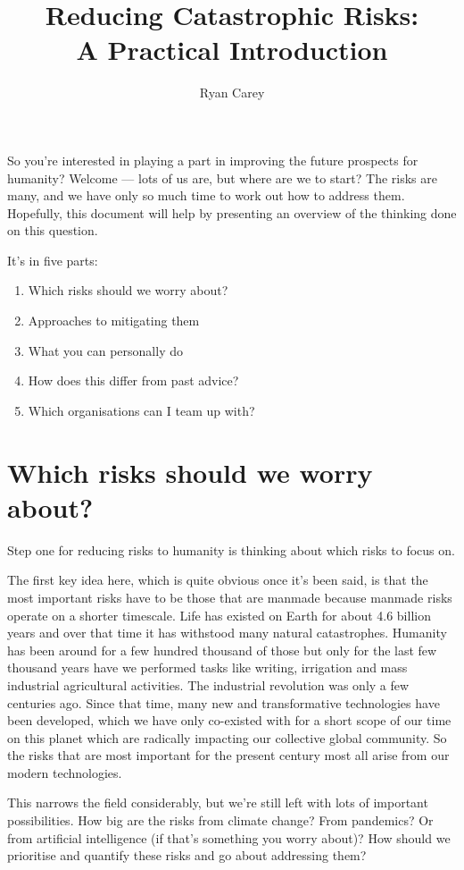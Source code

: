 \documentclass[12pt]{article}
\title{Reducing Catastrophic Risks:\\ A Practical Introduction}
\author{Ryan Carey}
\begin{document}
\maketitle
So you're interested in playing a part in improving the future prospects for humanity? Welcome --- lots of us are, but 
where are we to start? The risks are many, and we have only so much time to work out how to address them. Hopefully, 
this document 
will help by presenting an overview of the thinking done on this question.

It's in five parts: 
\begin{enumerate}
    \item Which risks should we worry about?
    \item Approaches to mitigating them
    \item What you can personally do 
    \item How does this differ from past advice? 
    \item Which organisations can I team up with?
\end{enumerate}

\section{Which risks should we worry about?}
Step one for reducing risks to humanity is thinking about which risks to focus on. 

The first key idea here, which is quite obvious once it's been said, is that the most important risks have to be those that are 
manmade because manmade risks operate on a shorter timescale. Life has existed on Earth for about 4.6 billion years and 
over that time it has withstood many natural catastrophes.
Humanity has been around for a few hundred thousand of those but only for the last few thousand years have we performed 
tasks like writing, irrigation and mass industrial agricultural activities. The industrial revolution was only a few centuries ago. 
Since that time, many new and transformative technologies have been developed, which we have only co-existed with   for a short scope of our time on this planet which are radically impacting our collective global community. So the risks that are most important for the present century most all arise from our 
modern technologies.

This narrows the field considerably, but we're still left with lots of important possibilities. How big are the risks from climate change? From pandemics? Or from artificial intelligence (if that's something you worry about)? How should we prioritise and quantify these risks and go about addressing them?
\end{document}
